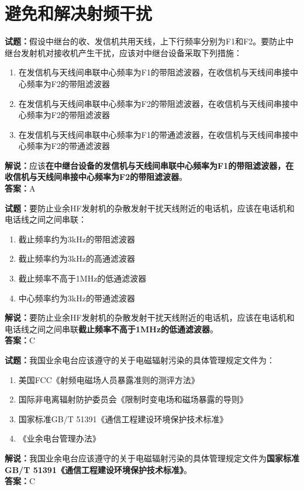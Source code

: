 \documentclass{ctexbook}
\begin{document}











\chapter{避免和解决射频干扰}

\newpage

\noindent\textbf{试题：}假设中继台的收、发信机共用天线，上下行频率分别为F1和F2。要防止中继台发射机对接收机产生干扰，应该对中继台设备采取下列措施：
\begin{enumerate}[leftmargin=3em]
	\item 在发信机与天线间串联中心频率为F1的带阻滤波器，在收信机与天线间串接中心频率为F2的带阻滤波器
	\item 在发信机与天线间串联中心频率为F2的带阻滤波器，在收信机与天线间串接中心频率为F2的带阻滤波器
	\item 在发信机与天线间串联中心频率为F1的带通滤波器，在收信机与天线间串接中心频率为F2的带通滤波器
\end{enumerate}
\noindent\textbf{解说：}应该\textbf{在中继台设备的发信机与天线间串联中心频率为F1的带阻滤波器，在收信机与天线间串接中心频率为F2的带阻滤波器}。\\\noindent\textbf{答案：}A

\bigskip


\noindent\textbf{试题：}要防止业余HF发射机的杂散发射干扰天线附近的电话机，应该在电话机和电话线之间之间串联：
\begin{enumerate}[leftmargin=3em]
	\item 截止频率约为3\si{\kHz}的带阻滤波器
	\item 截止频率约为3\si{\kHz}的高通滤波器
	\item 截止频率不高于1\si{\MHz}的低通滤波器
	\item 中心频率约为3\si{\kHz}的带通滤波器
\end{enumerate}
\noindent\textbf{解说：}要防止业余HF发射机的杂散发射干扰天线附近的电话机，应该在电话机和电话线之间之间串联\textbf{截止频率不高于1\si{\MHz}的低通滤波器}。\\\noindent
\textbf{答案：}C

\bigskip


\noindent\textbf{试题：}我国业余电台应该遵守的关于电磁辐射污染的具体管理规定文件为：
\begin{enumerate}[leftmargin=3em]
	\item 美国FCC《射频电磁场人员暴露准则的测评方法》
	\item 国际非电离辐射防护委员会《限制时变电场和磁场暴露的导则》
	\item 国家标准GB/T 51391《通信工程建设环境保护技术标准》
	\item 《业余电台管理办法》
\end{enumerate}
\noindent\textbf{解说：}我国业余电台应该遵守的关于电磁辐射污染的具体管理规定文件为\textbf{国家标准GB/T 51391《通信工程建设环境保护技术标准》}。\\\textbf{答案：}C
\end{document}
